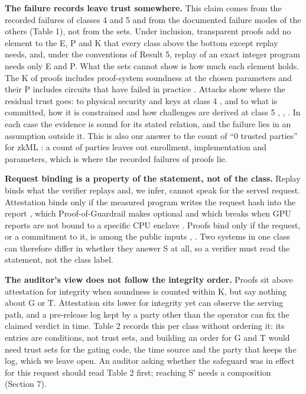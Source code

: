 \documentclass[11pt]{article}
\begin{document}
\textbf{The failure records leave trust somewhere.} This claim comes from the recorded failures of classes 4 and 5 and from the documented failure modes of the others (Table 1), not from the sets. Under inclusion, transparent proofs add no element to the E, P and K that every class above the bottom except replay needs, and, under the conventions of Result 5, replay of an exact integer program needs only E and P. What the sets cannot show is how much each element holds. The K of proofs includes proof-system soundness at the chosen parameters \cite{A28} and their P includes circuits that have failed in practice \cite{F1}. Attacks show where the residual trust goes: to physical security and keys at class 4 \cite{B16}, and to what is committed, how it is constrained and how challenges are derived at class 5 \cite{A23}, \cite{F1}, \cite{F2}. In each case the evidence is sound for its stated relation, and the failure lies in an assumption outside it. This is also our answer to the count of ``0 trusted parties'' for zkML \cite{A35}: a count of parties leaves out enrollment, implementation and parameters, which is where the recorded failures of proofs lie.

\textbf{Request binding is a property of the statement, not of the class.} Replay binds what the verifier replays and, we infer, cannot speak for the served request. Attestation binds only if the measured program writes the request hash into the report \cite{B2}, which Proof-of-Guardrail makes optional \cite{B24} and which breaks when GPU reports are not bound to a specific CPU enclave \cite{B16}. Proofs bind only if the request, or a commitment to it, is among the public inputs \cite{A12}, \cite{A32}. Two systems in one class can therefore differ in whether they answer S at all, so a verifier must read the statement, not the class label.

\textbf{The auditor's view does not follow the integrity order.} Proofs sit above attestation for integrity when soundness is counted within K, but say nothing about G or T. Attestation sits lower for integrity yet can observe the serving path, and a pre-release log kept by a party other than the operator can fix the claimed verdict in time. Table 2 records this per class without ordering it: its entries are conditions, not trust sets, and building an order for G and T would need trust sets for the gating code, the time source and the party that keeps the log, which we leave open. An auditor asking whether the safeguard was in effect for this request should read Table 2 first; reaching S′ needs a composition (Section 7).
\end{document}
